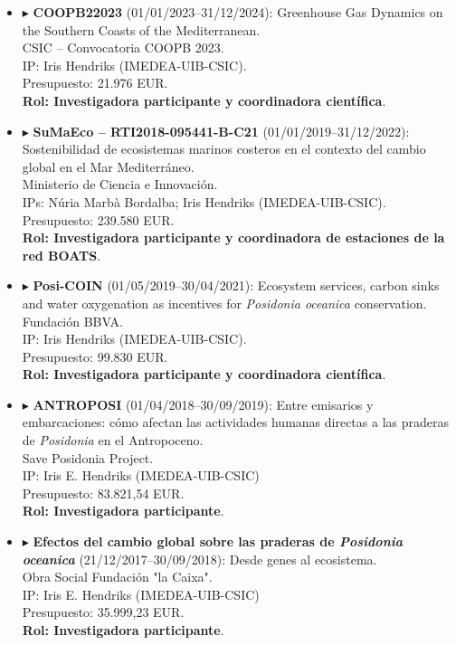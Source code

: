 \documentclass[11pt,a4paper]{article}
\begin{document}
\begin{itemize}[leftmargin=*]
    \item $\blacktriangleright$ \textbf{COOPB22023} (01/01/2023--31/12/2024):
    Greenhouse Gas Dynamics on the Southern Coasts of the Mediterranean.\\
    CSIC – Convocatoria COOPB 2023.\\
    IP: Iris Hendriks (IMEDEA-UIB-CSIC).\\
    Presupuesto: 21.976 EUR.\\
    \textbf{Rol: Investigadora participante y coordinadora científica}.

    \item $\blacktriangleright$ \textbf{SuMaEco – RTI2018-095441-B-C21} (01/01/2019--31/12/2022):
    Sostenibilidad de ecosistemas marinos costeros en el contexto del cambio global en el Mar Mediterráneo.\\
    Ministerio de Ciencia e Innovación.\\
    IPs: Núria Marbà Bordalba; Iris Hendriks (IMEDEA-UIB-CSIC).\\
    Presupuesto: 239.580 EUR.\\
    \textbf{Rol: Investigadora participante y coordinadora de estaciones de la red BOATS}.

    \item $\blacktriangleright$ \textbf{Posi-COIN} (01/05/2019--30/04/2021):
    Ecosystem services, carbon sinks and water oxygenation as incentives for \textit{Posidonia oceanica} conservation.\\
    Fundación BBVA.\\
    IP: Iris Hendriks (IMEDEA-UIB-CSIC).\\
    Presupuesto: 99.830 EUR.\\
    \textbf{Rol: Investigadora participante y coordinadora científica}.

    \item $\blacktriangleright$ \textbf{ANTROPOSI} (01/04/2018--30/09/2019):
    Entre emisarios y embarcaciones: cómo afectan las actividades humanas directas a las praderas de \textit{Posidonia} en el Antropoceno.\\
    Save Posidonia Project.\\
    IP: Iris E. Hendriks (IMEDEA-UIB-CSIC)\\
    Presupuesto: 83.821,54 EUR.\\
    \textbf{Rol: Investigadora participante}.

    \item $\blacktriangleright$ \textbf{Efectos del cambio global sobre las praderas de \textit{Posidonia oceanica}} (21/12/2017--30/09/2018):
    Desde genes al ecosistema.\\
    Obra Social Fundación "la Caixa".\\
    IP: Iris E. Hendriks (IMEDEA-UIB-CSIC)\\
    Presupuesto: 35.999,23 EUR.\\
    \textbf{Rol: Investigadora participante}.


\end{itemize}
\end{document}
